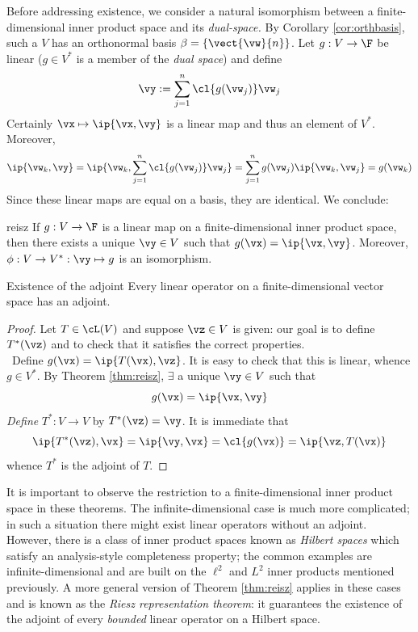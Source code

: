 Before addressing existence, we consider a natural isomorphism between a finite-dimensional inner product space and its \emph{dual-space.} By Corollary \ref{cor:orthbasis}, such a $V$ has an orthonormal basis $\beta=\{\vect{\vw}{n}\}$. Let $g:V\to \F$ be linear ($g\in V^*$ is a member of the \emph{dual space}) and define
\[\vy:=\sum_{j=1}^n\cl{g(\vw_j)}\vw_j\]
Certainly $\vx\mapsto \ip{\vx,\vy}$ is a linear map and thus an element of $V^*$. Moreover,
\[\ip{\vw_k,\vy} =\ip{\vw_k,\sum_{j=1}^n\cl{g(\vw_j)}\vw_j} =\sum_{j=1}^ng(\vw_j)\ip{\vw_k,\vw_j} =g(\vw_k)\]
Since these linear maps are equal on a basis, they are identical. We conclude:

\begin{thm}{}{reisz}
If $g:V\to\F$ is a linear map on a finite-dimensional inner product space, then there exists a unique $\vy\in V$ such that $g(\vx)=\ip{\vx,\vy}$. Moreover, $\phi:V\to V^*:\vy\mapsto g$ is an isomorphism.
\end{thm}


\begin{thm}{Existence of the adjoint}{}
Every linear operator on a finite-dimensional vector space has an adjoint.
\end{thm}

\begin{proof}
Let $T\in\cL(V)$ and suppose $\vz\in V$ is given: our goal is to define $T^*(\vz)$ and to check that it satisfies the correct properties.\\\
Define $g(\vx)=\ip{T(\vx),\vz}$. It is easy to check that this is linear, whence $g\in V^*$. By Theorem \ref{thm:reisz}, $\exists$ a unique $\vy\in V$ such that
\[g(\vx)=\ip{\vx,\vy}\]
\emph{Define} $T^*:V\to V$ by $T^*(\vz)=\vy$. It is immediate that
\[\ip{T^*(\vz),\vx}=\ip{\vy,\vx}=\cl{g(\vx)} =\ip{\vz,T(\vx)}\]
whence $T^*$ is the adjoint of $T$.
\end{proof}

It is important to observe the restriction to a finite-dimensional inner product space in these theorems. The infinite-dimensional case is much more complicated; in such a situation there might exist linear operators without an adjoint. However, there is a class of inner product spaces known as \emph{Hilbert spaces} which satisfy an analysis-style completeness property; the common examples are infinite-dimensional and are built on the $\ell^2$ and $L^2$ inner products mentioned previously. A more general version of Theorem \ref{thm:reisz} applies in these cases and is known as the \emph{Riesz representation theorem}: it guarantees the existence of the adjoint of every \emph{bounded} linear operator on a Hilbert space. 

